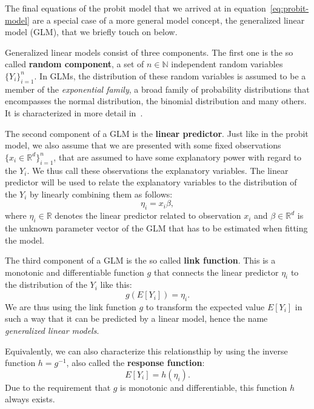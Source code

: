 The final equations of the probit model that we arrived at
in equation~\ref{eq:probit-model} are a special case of a more
general model concept, the generalized linear model (GLM),
that we briefly touch on below.

Generalized linear models consist of three components.
The first one is the so called \textbf{random component},
a set of $n \in \mathbb{N}$ independent random variables $\{ Y_i \}_{i=1}^n$.
In GLMs, the distribution of these random variables is assumed
to be a member of the \textit{exponential family}, a broad family of
probability distributions that encompasses the normal distribution,
the binomial distribution and many others.
It is characterized in more detail in~\cite{glm-agresti}.

The second component of a GLM is the \textbf{linear predictor}.
Just like in the probit model, we also assume that we are
presented with some fixed observations $\{x_i \in \mathbb{R}^d\}_{i=1}^n$,
that are assumed to have some explanatory power with regard to
the $Y_i$. We thus call these observations the explanatory variables.
The linear predictor will be used to relate the explanatory variables
to the distribution of the $Y_i$ by linearly combining them as follows:
\begin{equation*}
    \eta_i = x_i \beta,
\end{equation*}
where $\eta_i \in \mathbb{R}$ denotes the linear predictor related
to observation $x_i$ and
$\beta \in \mathbb{R}^d$ is the unknown parameter vector of the GLM
that has to be estimated when fitting the model.

The third component of a GLM is the so called \textbf{link function}.
This is a monotonic and differentiable function
$g$
that connects the linear predictor $\eta_i$ to the distribution of the
$Y_i$ like this:
\begin{equation*}
    g(E[Y_i]) = \eta_i.
\end{equation*}
We are thus using the link function $g$ to transform the expected value
$E[Y_i]$ in such a way that it can be predicted by a linear model,
hence the name \textit{generalized linear models}.

Equivalently, we can also characterize this relationsthip by using
the inverse function $h = g^{-1}$,
also called the \textbf{response function}:
\begin{equation*}
    E[Y_i] = h(\eta_i).
\end{equation*}
Due to the requirement that $g$ is monotonic and differentiable,
this function $h$ always exists.

